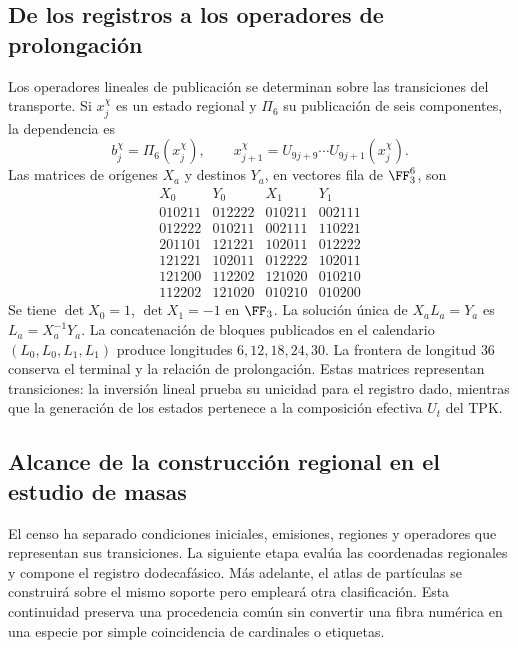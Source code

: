 \subsection{De los registros a los operadores de prolongación}

Los operadores lineales de publicación se determinan sobre las
transiciones del transporte. Si \(x_j^\chi\) es un estado regional
y \(\Pi_6\) su publicación de seis componentes, la dependencia es
\[
 b_j^\chi=\Pi_6(x_j^\chi),\qquad
 x_{j+1}^\chi=U_{9j+9}\cdots U_{9j+1}(x_j^\chi).
\]
Las matrices de orígenes \(X_a\) y destinos \(Y_a\), en
vectores fila de \(\FF_3^6\), son
\[
\begin{array}{c|c|c|c}
X_0&Y_0&X_1&Y_1\\\hline
010211&012222&010211&002111\\
012222&010211&002111&110221\\
201101&121221&102011&012222\\
121221&102011&012222&102011\\
121200&112202&121020&010210\\
112202&121020&010210&010200
\end{array}
\]
Se tiene \(\det X_0=1\), \(\det X_1=-1\) en \(\FF_3\).
La solución única de \(X_aL_a=Y_a\) es \(L_a=X_a^{-1}Y_a\).
La concatenación de bloques publicados en el calendario
\((L_0,L_0,L_1,L_1)\) produce longitudes
\(6,12,18,24,30\). La frontera de longitud \(36\) conserva
el terminal y la relación de prolongación. Estas matrices
representan transiciones: la inversión lineal prueba su unicidad
para el registro dado, mientras que la generación de los estados
pertenece a la composición efectiva \(U_t\) del TPK.

\subsection{Alcance de la construcción regional en el estudio de masas}

El censo ha separado condiciones iniciales, emisiones, regiones y
operadores que representan sus transiciones. La siguiente etapa
evalúa las coordenadas regionales y compone el registro dodecafásico.
Más adelante, el atlas de partículas se construirá sobre el mismo
soporte pero empleará otra clasificación. Esta continuidad preserva
una procedencia común sin convertir una fibra numérica en una
especie por simple coincidencia de cardinales o etiquetas.
